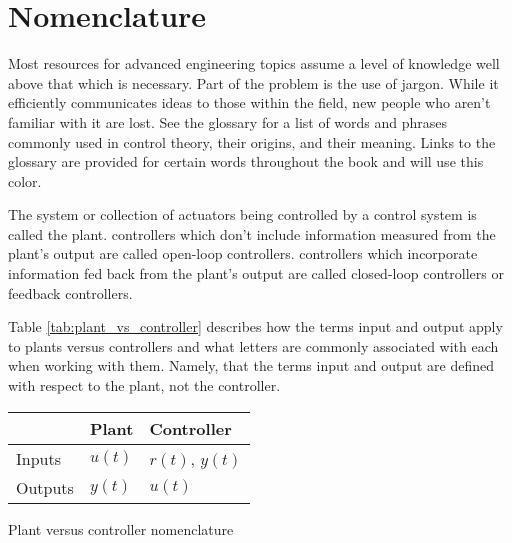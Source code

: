 \section{Nomenclature}

Most resources for advanced engineering topics assume a level of knowledge well
above that which is necessary. Part of the problem is the use of jargon. While
it efficiently communicates ideas to those within the field, new people who
aren't familiar with it are lost. See the glossary for a list of words and
phrases commonly used in control theory, their origins, and their meaning. Links
to the glossary are provided for certain words throughout the book and will use
\textcolor{glscolor}{this color}.

The \gls{system} or collection of actuators being controlled by a
\gls{control system} is called the \gls{plant}. \Glspl{controller} which don't
include information measured from the \gls{plant}'s \gls{output} are called
open-loop \glspl{controller}. \Glspl{controller} which incorporate information
fed back from the \gls{plant}'s \gls{output} are called closed-loop
\glspl{controller} or feedback \glspl{controller}.

Table \ref{tab:plant_vs_controller} describes how the terms \gls{input} and
\gls{output} apply to \glspl{plant} versus \glspl{controller} and what letters
are commonly associated with each when working with them. Namely, that the terms
\gls{input} and \gls{output} are defined with respect to the \gls{plant}, not
the \gls{controller}.

\begin{booktable}
  \begin{tabular}{|l|ll|}
    \hline
    \rowcolor{headingbg}
    & \textbf{Plant} & \textbf{Controller} \\
    \hline
    Inputs & $u(t)$ & $r(t)$, $y(t)$ \\
    Outputs & $y(t)$ & $u(t)$ \\
    \hline
  \end{tabular}
  \caption{Plant versus controller nomenclature}
  \label{tab:plant_vs_controller}
\end{booktable}
